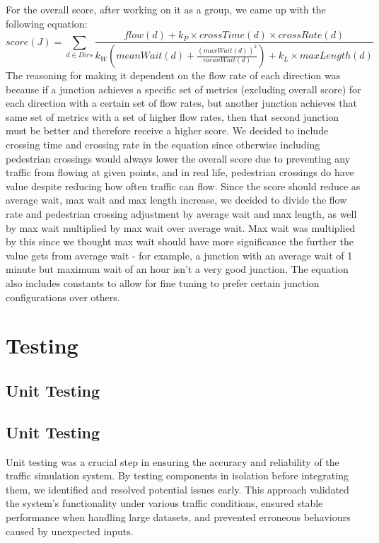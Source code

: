 \documentclass{article}
\begin{document}
    For the overall score, after working on it as a group, we came up with the following equation:
    $$score(J) = \sum_{d \in Dirs}\frac{flow(d) + k_P\times crossTime(d) \times crossRate(d)}{k_W (meanWait(d)+\frac{(maxWait(d))^2}{meanWait(d)}) + k_L\times maxLength(d)}$$
    The reasoning for making it dependent on the flow rate of each direction was because if a junction achieves a specific set of metrics (excluding overall score) for each direction with a certain set of flow rates, but another junction achieves that same set of metrics with a set of higher flow rates, then that second junction must be better and therefore receive a higher score. We decided to include crossing time and crossing rate in the equation since otherwise including pedestrian crossings would always lower the overall score due to preventing any traffic from flowing at given points, and in real life, pedestrian crossings do have value despite reducing how often traffic can flow. Since the score should reduce as average wait, max wait and max length increase, we decided to divide the flow rate and pedestrian crossing adjustment by average wait and max length, as well by max wait multiplied by max wait over average wait. Max wait was multiplied by this since we thought max wait should have more significance the further the value gets from average wait - for example, a junction with an average wait of 1 minute but maximum wait of an hour isn’t a very good junction. The equation also includes constants to allow for fine tuning to prefer certain junction configurations over others.


    \section{Testing}

    \subsection{Unit Testing}

    \subsection{Unit Testing}
    Unit testing was a crucial step in ensuring the accuracy and reliability of the traffic simulation system. By testing components in isolation before integrating them, we identified and resolved potential issues early. This approach validated the system’s functionality under various traffic conditions, ensured stable performance when handling large datasets, and prevented erroneous behaviours caused by unexpected inputs.
\end{document}

